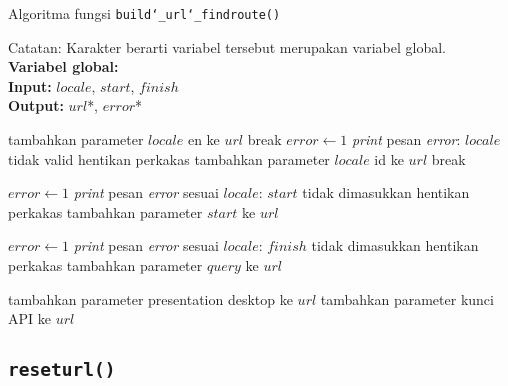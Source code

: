 \begin{algorithm}[h]
	\caption{Algoritma fungsi \texttt{build\char`_url\char`_findroute()}}
	\label{alg:design-buildurl-findroute}
	\vspace{-0.6\baselineskip}
	\begin{flushleft}
		Catatan: Karakter \textquotesingle *\textquotesingle\xspace berarti variabel tersebut merupakan variabel global.\\
		\textbf{Variabel global:}  \\
        \textbf{Input:} $locale$, $start$, $finish$ \\
        \textbf{Output:} $url$*, $error$* \\
	\end{flushleft}
	\vspace{-1.05\baselineskip}
	\begin{algorithmic}
	
			    \State tambahkan parameter $locale$ \textquotesingle\textquotesingle en\textquotesingle\textquotesingle\xspace ke $url$
				\State break
			\EndCase
			    \State $error \gets 1$
				\State \textit{print} pesan \textit{error}: $locale$ tidak valid
				\State hentikan perkakas
			\EndCase
			\Default
				\State tambahkan parameter $locale$ \textquotesingle\textquotesingle id\textquotesingle\textquotesingle\xspace ke $url$
				\State break
			\EndDefault
		\EndSwitch
		
		    \State $error \gets 1$
			\State \textit{print} pesan \textit{error} sesuai $locale$: $start$ tidak dimasukkan
			\State hentikan perkakas
		\Else
			\State tambahkan parameter $start$ ke $url$
		\EndIf
		
		    \State $error \gets 1$
			\State \textit{print} pesan \textit{error} sesuai $locale$: $finish$ tidak dimasukkan
			\State hentikan perkakas
		\Else
			\State tambahkan parameter $query$ ke $url$
		\EndIf
		
		\State tambahkan parameter presentation \textquotesingle\textquotesingle desktop\textquotesingle\textquotesingle\xspace ke $url$
		\State tambahkan parameter kunci API ke $url$
	\end{algorithmic}
\end{algorithm}

\subsection{\texttt{reset\textunderscore url()}}
\label{sec:design-code-buildurl-reset}

